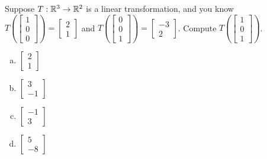 \begin{applicationActivities}{1}{17}
\begin{activity}{5}
Suppose $T: \mathbb{R}^3 \rightarrow \mathbb{R}^2$ is a linear transformation, and you know $T\left(\begin{bmatrix} 1 \\ 0 \\ 0 \end{bmatrix} \right) = \begin{bmatrix} 2 \\ 1 \end{bmatrix} $ and $T\left(\begin{bmatrix} 0 \\ 0 \\ 1 \end{bmatrix} \right) = \begin{bmatrix} -3 \\ 2 \end{bmatrix} $.  Compute $T\left(\begin{bmatrix} 1 \\ 0 \\ 1 \end{bmatrix}\right)$.
\begin{multicols}{2}
\begin{enumerate}[(a)]
\item $\begin{bmatrix} 2 \\ 1\end{bmatrix}$
\item $\begin{bmatrix} 3 \\ -1 \end{bmatrix}$
\item $\begin{bmatrix} -1 \\ 3 \end{bmatrix}$
\item $\begin{bmatrix} 5 \\ -8 \end{bmatrix}$
\end{enumerate}
\end{multicols}
\end{activity}


\end{applicationActivities}
